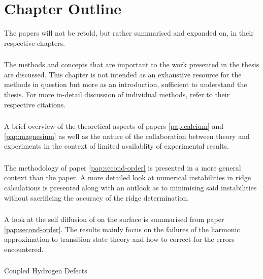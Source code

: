 \section{Chapter Outline}
\label{sec:chapters}

The papers will not be retold, but rather summarised and expanded on, in their respective chapters.

\subsubsection{}
The methods and concepts that are important to the work presented in the thesis are discussed.
This chapter is not intended as an exhaustive resource for the methods in question but more as an introduction, sufficient to understand the thesis.
For more in-detail discussion of individual methods, refer to their respective citations.

\subsubsection{}
A brief overview of the theoretical aspects of papers \ref{pap:calcium} and \ref{pap:magnesium} as well as the nature of the collaboration between theory and experiments in the context of limited availablity of experimental results.

\subsubsection{}
The methodology of paper \ref{pap:second-order} is presented in a more general context than the paper.
A more detailed look at numerical instabilities in ridge calculations is presented along with an outlook as to minimising said instabilities without sacrificing the accuracy of the ridge determination.

\subsubsection{}
A look at the self diffusion of  on the  surface is summarised from paper \ref{pap:second-order}.
The results mainly focus on the failures of the harmonic approximation to transition state theory and how to correct for the errors encountered.

\subsubsection{}
Coupled Hydrogen Defects \expand

